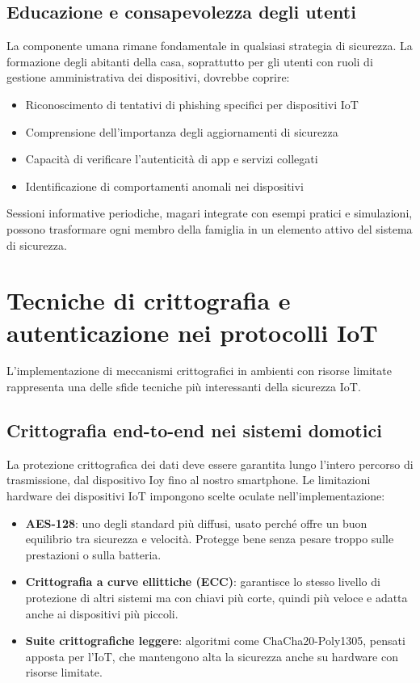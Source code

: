 \subsection{Educazione e consapevolezza degli utenti}

La componente umana rimane fondamentale in qualsiasi strategia di sicurezza. La formazione degli abitanti della casa, soprattutto per gli utenti con ruoli di gestione amministrativa dei dispositivi,  dovrebbe coprire:

\begin{itemize}
    \item Riconoscimento di tentativi di phishing specifici per dispositivi IoT
    \item Comprensione dell'importanza degli aggiornamenti di sicurezza
    \item Capacità di verificare l'autenticità di app e servizi collegati
    \item Identificazione di comportamenti anomali nei dispositivi
\end{itemize}

Sessioni informative periodiche, magari integrate con esempi pratici e simulazioni, possono trasformare ogni membro della famiglia in un elemento attivo del sistema di sicurezza.

\section{Tecniche di crittografia e autenticazione nei protocolli IoT}

L'implementazione di meccanismi crittografici in ambienti con risorse limitate rappresenta una delle sfide tecniche più interessanti della sicurezza IoT.

\subsection{Crittografia end-to-end nei sistemi domotici}

La protezione crittografica dei dati deve essere garantita lungo l'intero percorso di trasmissione, dal dispositivo Ioy fino al nostro smartphone. Le limitazioni hardware dei dispositivi IoT impongono scelte oculate nell'implementazione:

\begin{itemize}
    \item \textbf{AES-128}: uno degli standard più diffusi, usato perché offre un buon equilibrio tra sicurezza e velocità. Protegge bene senza pesare troppo sulle prestazioni o sulla batteria.
    \item \textbf{Crittografia a curve ellittiche (ECC)}: garantisce lo stesso livello di protezione di altri sistemi ma con chiavi più corte, quindi più veloce e adatta anche ai dispositivi più piccoli.
    \item \textbf{Suite crittografiche leggere}: algoritmi come ChaCha20-Poly1305, pensati apposta per l’IoT, che mantengono alta la sicurezza anche su hardware con risorse limitate.
\end{itemize}

